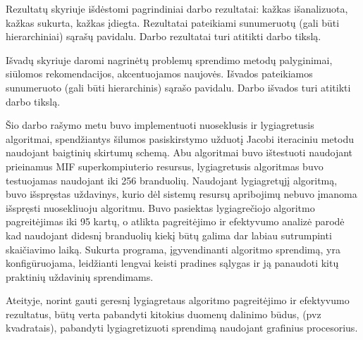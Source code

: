 \documentclass{VUMIFPSbakalaurinis}
\begin{document}




Rezultatų skyriuje išdėstomi  pagrindiniai  darbo  rezultatai: kažkas  išanalizuota,
kažkas sukurta, kažkas įdiegta. Rezultatai pateikiami sunumeruotų (gali būti
hierarchiniai) sąrašų pavidalu. Darbo rezultatai turi atitikti darbo tikslą.


Išvadų skyriuje daromi nagrinėtų problemų sprendimo metodų palyginimai, siūlomos
rekomendacijos, akcentuojamos naujovės. Išvados pateikiamos sunumeruoto
(gali būti hierarchinis) sąrašo pavidalu. Darbo išvados turi atitikti darbo tikslą.

Šio darbo rašymo metu buvo implementuoti nuoseklusis ir lygiagretusis algoritmai, spendžiantys šilumos pasiskirstymo užduotį Jacobi iteraciniu metodu naudojant baigtinių skirtumų schemą.
Abu algoritmai buvo ištestuoti naudojant prieinamus MIF superkompiuterio resursus, lygiagretusis algoritmas buvo testuojamas naudojant iki 256 branduolių.
Naudojant lygiagretųjį algoritmą, buvo išspręstas uždavinys, kurio dėl sistemų resursų apribojimų nebuvo įmanoma išspręsti nuosekliuoju algoritmu. 
Buvo pasiektas lygiagrečiojo algoritmo pagreitėjimas iki 95 kartų, o atlikta pagreitėjimo ir efektyvumo analizė parodė kad naudojant didesnį branduolių kiekį būtų galima dar labiau sutrumpinti skaičiavimo laiką.
Sukurta programa, įgyvendinanti algoritmo sprendimą, yra konfigūruojama, leidžianti lengvai keisti pradines sąlygas ir ją panaudoti kitų praktinių uždavinių sprendimams.

Ateityje, norint gauti geresnį lygiagretaus algoritmo pagreitėjimo ir efektyvumo rezultatus, būtų verta pabandyti kitokius duomenų dalinimo būdus, (pvz kvadratais), pabandyti lygiagretizuoti sprendimą naudojant grafinius procesorius.
\end{document}
